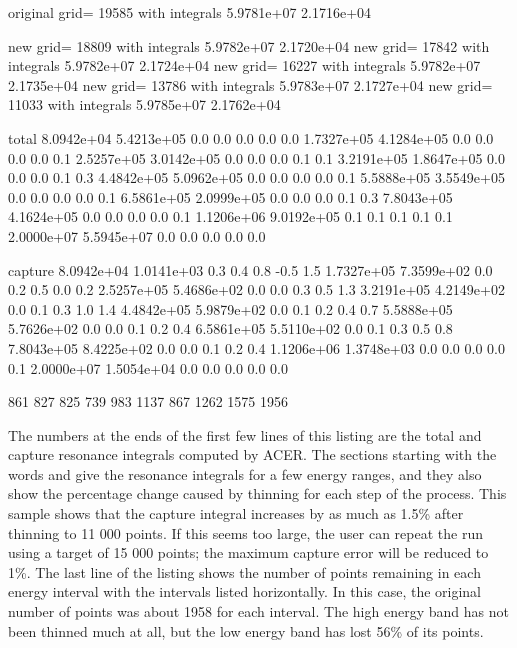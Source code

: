 \newpage
\small
\begin{ccode}

 original grid= 19585 with integrals   5.9781e+07  2.1716e+04

 new grid= 18809 with integrals   5.9782e+07  2.1720e+04
 new grid= 17842 with integrals   5.9782e+07  2.1724e+04
 new grid= 16227 with integrals   5.9782e+07  2.1735e+04
 new grid= 13786 with integrals   5.9783e+07  2.1727e+04
 new grid= 11033 with integrals   5.9785e+07  2.1762e+04


 total
   8.0942e+04  5.4213e+05   0.0   0.0   0.0   0.0   0.0
   1.7327e+05  4.1284e+05   0.0   0.0   0.0   0.0   0.1
   2.5257e+05  3.0142e+05   0.0   0.0   0.0   0.1   0.1
   3.2191e+05  1.8647e+05   0.0   0.0   0.0   0.1   0.3
   4.4842e+05  5.0962e+05   0.0   0.0   0.0   0.0   0.1
   5.5888e+05  3.5549e+05   0.0   0.0   0.0   0.0   0.1
   6.5861e+05  2.0999e+05   0.0   0.0   0.0   0.1   0.3
   7.8043e+05  4.1624e+05   0.0   0.0   0.0   0.0   0.1
   1.1206e+06  9.0192e+05   0.1   0.1   0.1   0.1   0.1
   2.0000e+07  5.5945e+07   0.0   0.0   0.0   0.0   0.0


 capture
   8.0942e+04  1.0141e+03   0.3   0.4   0.8  -0.5   1.5
   1.7327e+05  7.3599e+02   0.0   0.2   0.5   0.0   0.2
   2.5257e+05  5.4686e+02   0.0   0.0   0.3   0.5   1.3
   3.2191e+05  4.2149e+02   0.0   0.1   0.3   1.0   1.4
   4.4842e+05  5.9879e+02   0.0   0.1   0.2   0.4   0.7
   5.5888e+05  5.7626e+02   0.0   0.0   0.1   0.2   0.4
   6.5861e+05  5.5110e+02   0.0   0.1   0.3   0.5   0.8
   7.8043e+05  8.4225e+02   0.0   0.0   0.1   0.2   0.4
   1.1206e+06  1.3748e+03   0.0   0.0   0.0   0.0   0.1
   2.0000e+07  1.5054e+04   0.0   0.0   0.0   0.0   0.0


    861   827   825   739   983  1137   867  1262  1575  1956

\end{ccode}
\normalsize

\noindent
The numbers at the ends of the first few lines of this listing are
the total and capture resonance integrals computed by ACER.  The
sections starting with the words  and 
give the resonance integrals for a few energy ranges, and they also
show the percentage change caused by thinning for each step of the
process.  This sample shows that the capture integral increases by
as much as 1.5\% after thinning to 11 000 points.  If this seems too
large, the user can repeat the run using a target of 15 000 points;
the maximum capture error will be reduced to 1\%.  The last line
of the listing shows the number of points remaining in each energy
interval with the intervals listed horizontally.  In this case, the
original number of points was about 1958 for each interval.  The
high energy band has not been thinned much at all, but the low energy
band has lost 56\% of its points.


